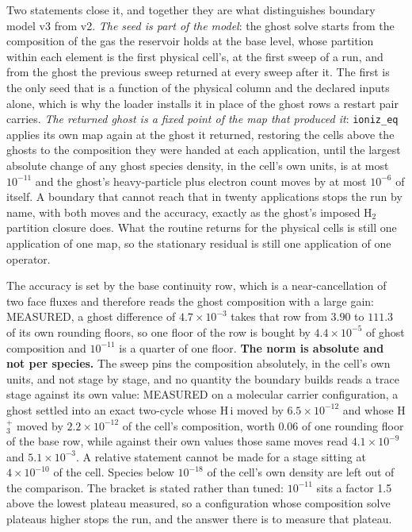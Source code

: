 Two statements close it, and together they are what distinguishes boundary
model v3 from v2.  \emph{The seed is part of the model}: the ghost solve
starts from the composition of the gas the reservoir holds at the base level,
whose partition within each element is the first physical cell's, at the
first sweep of a run, and from the ghost the previous sweep returned at every
sweep after it.  The first is the only seed that is a function of the
physical column and the declared inputs alone, which is why the loader
installs it in place of the ghost rows a restart pair carries.  \emph{The
returned ghost is a fixed point of the map that produced it}: \texttt{ioniz\_eq}
applies its own map again at the ghost it returned, restoring the cells above
the ghosts to the composition they were handed at each application, until the
largest absolute change of any ghost species density, in the cell's own
units, is at most $10^{-11}$ and the ghost's heavy-particle plus electron
count moves by at most $10^{-6}$ of itself.  A boundary that cannot reach
that in twenty applications stops the run by name, with both moves and the
accuracy, exactly as the ghost's imposed H$_2$ partition closure does.  What
the routine returns for the physical cells is still one application of one
map, so the stationary residual is still one application of one operator.

The accuracy is set by the base continuity row, which is a near-cancellation
of two face fluxes and therefore reads the ghost composition with a large
gain: MEASURED, a ghost difference of $4.7\times10^{-3}$ takes that row from
$3.90$ to $111.3$ of its own rounding floors, so one floor of the row is
bought by $4.4\times10^{-5}$ of ghost composition and $10^{-11}$ is a quarter
of one floor.  \textbf{The norm is absolute and not per species.}  The sweep
pins the composition absolutely, in the cell's own units, and not stage by
stage, and no quantity the boundary builds reads a trace stage against its
own value: MEASURED on a molecular carrier configuration, a ghost settled
into an exact two-cycle whose H\,{\sc i} moved by $6.5\times10^{-12}$ and
whose H$_3^+$ moved by $2.2\times10^{-12}$ of the cell's composition, worth
$0.06$ of one rounding floor of the base row, while against their own values
those same moves read $4.1\times10^{-9}$ and $5.1\times10^{-3}$.  A relative
statement cannot be made for a stage sitting at $4\times10^{-10}$ of the
cell.  Species below $10^{-18}$ of the cell's own density are left out of the
comparison.  The bracket is stated rather than tuned: $10^{-11}$ sits a
factor 1.5 above the lowest plateau measured, so a configuration whose
composition solve plateaus higher stops the run, and the answer there is to
measure that plateau.

